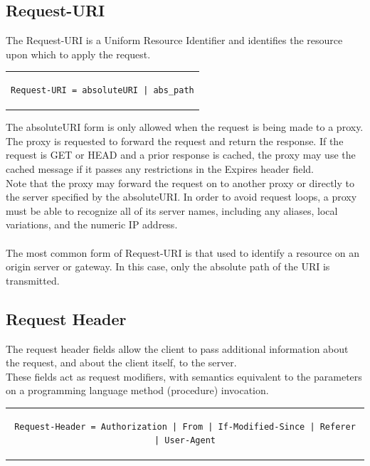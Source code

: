 \subsection{Request-URI}
The Request-URI is a Uniform Resource Identifier and identifies the resource upon which to apply the request.
\begin{center}
\begin{tabular}{c}
\begin{lstlisting}[linewidth=190pt, basicstyle=\footnotesize\sffamily,]
Request-URI = absoluteURI | abs_path
\end{lstlisting}
\end{tabular}
\end{center}
The absoluteURI form is only allowed when the request is being made to a proxy. The proxy is requested to forward the request and return the response. If the request is GET or HEAD and a prior response is cached, the proxy may use the cached message if it passes any restrictions in the Expires header field.\\
Note that the proxy may forward the request on to another proxy or directly to the server specified by the absoluteURI. In order to avoid request loops, a proxy must be able to recognize all of its server names, including any aliases, local variations, and the numeric IP address.\\\\
The most common form of Request-URI is that used to identify a resource on an origin server or gateway. In this case, only the absolute path of the URI is transmitted.

\subsection{Request Header}
The request header fields allow the client to pass additional information about the request, and about the client itself, to the server.\\
These fields act as request modifiers, with semantics equivalent to the parameters on a programming language method (procedure) invocation.
\begin{center}
\begin{tabular}{c}
\begin{lstlisting}[linewidth=410pt, basicstyle=\footnotesize\sffamily,]
Request-Header = Authorization | From | If-Modified-Since | Referer | User-Agent
\end{lstlisting}
\end{tabular}
\end{center}

